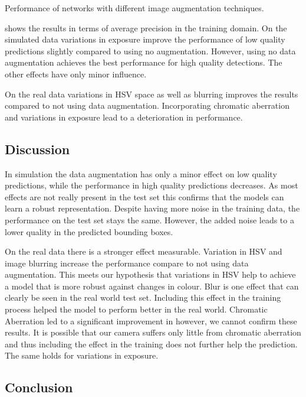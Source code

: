 \begin{table}[hbtp]
	\centering
	
	\caption{Performance of networks with different image augmentation techniques. }
	\label{tab:aug}
\end{table}

 shows the results in terms of average precision in the training domain. On the simulated data variations in exposure improve the performance of low quality predictions slightly compared to using no augmentation. However, using no data augmentation achieves the best performance for high quality detections. The other effects have only minor influence. 

On the real data variations in HSV space as well as blurring improves the results compared to not using data augmentation. Incorporating chromatic aberration and variations in exposure lead to a deterioration in performance.

\subsection{Discussion}

In simulation the data augmentation has only a minor effect on low quality predictions, while the performance in high quality predictions decreases. As most effects are not really present in the test set this confirms that the models can learn a robust representation. Despite having more noise in the training data, the performance on the test set stays the same. However, the added noise leads to a lower quality in the predicted bounding boxes.

On the real data there is a stronger effect measurable. Variation in HSV and image blurring increase the performance compare to not using data augmentation. This meets our hypothesis that variations in HSV help to achieve a model that is more robust against changes in colour. Blur is one effect that can clearly be seen in the real world test set. Including this effect in the training process helped the model to perform better in the real world. Chromatic Aberration led to a significant improvement in \cite{Carlson2018} however, we cannot confirm these results. It is possible that our camera suffers only little from  chromatic aberration and thus including the effect in the training does not further help the prediction. The same holds for variations in exposure. 

\subsection{Conclusion}


